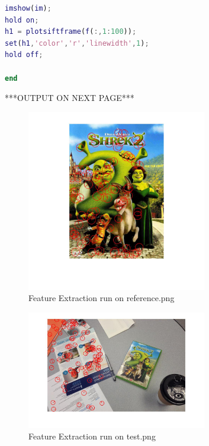 \documentclass{csc_assignment4}
\begin{document}
\begin{description}
\begin{enumerate}[label=(\alph*)]
\begin{lstlisting}[language=MATLAB]
% Plot images (used separate library for plotting because vl_plotframe caused errors)
imshow(im);
hold on;
h1 = plotsiftframe(f(:,1:100));
set(h1,'color','r','linewidth',1);
hold off;

end
\end{lstlisting}
***OUTPUT ON NEXT PAGE***
\begin{figure}
\vspace*{-25mm}
\includegraphics[width=0.7\textwidth, center]{reference_features.jpg}
\vspace*{-20mm}
\caption{Feature Extraction run on reference.png}
\vspace*{-22mm}
\end{figure}
\vspace*{-25mm}
\begin{figure}
\includegraphics[width=0.7\textwidth, center]{test_features.jpg}
\vspace*{-14mm}
\caption{Feature Extraction run on test.png}
\end{figure}
\begin{figure}

\end{figure}
\end{enumerate}
\end{description}
\end{document}
